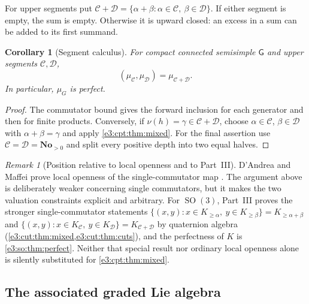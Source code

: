 \documentclass[11pt,letterpaper]{article}
\numberwithin{equation}{section}
\newtheorem{corollary}[corollary]{Corollary}
\theoremstyle{definition}
\theoremstyle{remark}
\newtheorem{remark}[remark]{Remark}
\newcommand{\No}{\mathbf{No}}
\newcommand{\SO}{\operatorname{SO}}
\newcommand{\comm}[2]{\left(#1,#2\right)}
\newcommand{\commset}[2]{\{\comm{x}{y}:x\in #1,\ y\in #2\}}
\newcommand{\sG}{\mathsf G}
\begin{document}
For upper segments put
$\mathcal C+\mathcal D=\{\alpha+\beta:\alpha\in\mathcal C,\ \beta\in\mathcal D\}$.
If either segment is empty, the sum is empty. Otherwise it is upward closed: an
excess in a sum can be added to its first summand.

\begin{corollary}[Segment calculus]\label{e3:cpt:cor:cutcomm}
For compact connected semisimple $\sG$ and upper segments $\mathcal C,\mathcal D$,
\[
 \comm{\mu_{\mathcal C}}{\mu_{\mathcal D}}=\mu_{\mathcal C+\mathcal D}.
\]
In particular, $\mu_G$ is perfect.
\end{corollary}
\begin{proof}
The commutator bound gives the forward inclusion for each generator and then for
finite products. Conversely, if $\nu(h)=\gamma\in\mathcal C+\mathcal D$, choose
$\alpha\in\mathcal C$, $\beta\in\mathcal D$ with $\alpha+\beta=\gamma$ and
apply \cref{e3:cpt:thm:mixed}. For the final assertion use
$\mathcal C=\mathcal D=\No_{>0}$ and split every positive depth into two equal
halves.
\end{proof}

\begin{remark}[Position relative to local openness and to Part~III]\label{e3:cpt:rem:openness}
D'Andrea and Maffei prove local openness of the single-commutator map
\cite[Theorem~2.5]{DM}. The argument above is deliberately weaker concerning
single commutators, but it makes the two valuation constraints explicit and
arbitrary. For $\SO(3)$, Part~III proves the stronger single-commutator
statements $\commset{K_{\ge\alpha}}{K_{\ge\beta}}=K_{\ge\alpha+\beta}$ and
$\commset{K_{\mathcal C}}{K_{\mathcal D}}=K_{\mathcal C+\mathcal D}$ by
quaternion algebra (\cref{e3:cut:thm:mixed,e3:cut:thm:cuts}), and the perfectness
of $K$ is \cref{e3:so:thm:perfect}. Neither that special result nor ordinary
local openness alone is silently substituted for \cref{e3:cpt:thm:mixed}.
\end{remark}

\subsection{The associated graded Lie algebra}
\end{document}
